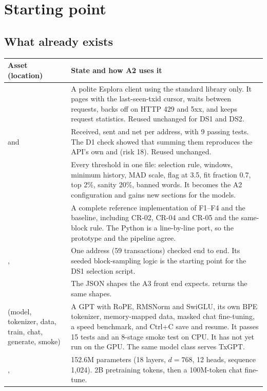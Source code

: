 \section{Starting point}
\label{sec:start}

\subsection{What already exists}

\begin{center}
\small
\begin{tabularx}{\textwidth}{@{}L{5.0cm}Y@{}}
\toprule
\textbf{Asset (location)} & \textbf{State and how A2 uses it} \\
\midrule
{} & A polite Esplora client using the standard library only. It pages with the last-seen-txid cursor, waits between requests, backs off on HTTP 429 and 5xx, and keeps request statistics. Reused unchanged for DS1 and DS2. \\
 and  & Received, sent and net per address, with 9 passing tests. The D1 check showed that summing them reproduces the API's own  and  (risk 18). Reused unchanged. \\
 & Every threshold in one file: selection rule, windows, minimum history, MAD scale, flag at 3.5, fit fraction 0.7, top 2\%, sanity 20\%, banned words. It becomes the A2 configuration and gains new sections for the models. \\
 & A complete reference implementation of F1--F4 and the baseline, including CR-02, CR-04 and CR-05 and the same-block rule. The Python  is a line-by-line port, so the prototype and the pipeline agree. \\
,  & One address (59 transactions) checked end to end. Its seeded block-sampling logic is the starting point for the DS1 selection script. \\
 & The JSON shapes the A3 front end expects.  returns the same shapes. \\
 (model, tokenizer, data, train, chat, generate, smoke) & A GPT with RoPE, RMSNorm and SwiGLU, its own BPE tokenizer, memory-mapped data, masked chat fine-tuning, a speed benchmark, and Ctrl+C save and resume. It passes 15 tests and an 8-stage smoke test on CPU. It has not yet run on the GPU. The same model class serves TxGPT. \\
,  & 152.6M parameters (18 layers, $d=768$, 12 heads, sequence 1,024). 2B pretraining tokens, then a 100M-token chat fine-tune. \\
\bottomrule
\end{tabularx}
\end{center}

